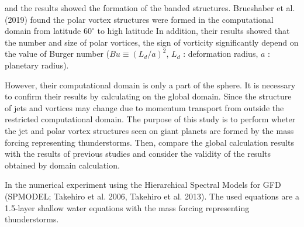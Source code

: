 \documentclass[a4j,8pt]{jarticle}
\begin{document}
and the results showed the formation of the banded structures.
%
Brueshaber et al. (2019) found the polar vortex structures were formed
in the computational domain from latitude $60^\circ$ to high latitude
%
In addition, their results showed
that the number and size of polar vortices,
the sign of vorticity significantly depend on
the value of Burger number ($Bu \equiv (L_d/a)^2$, $L_d$ : deformation radius, $a$ : planetary radius).

However, their computational domain is only a part of the sphere.
It is necessary to confirm their results by calculating on the global domain.
Since the structure of jets and vortices may change due to momentum transport from
outside the restricted computational domain.
%
The purpose of this study is to perform
wheter the jet and polar vortex structures seen on giant planets are
formed by the mass forcing representing thunderstorms.
%
Then, compare the global calculation results with the results of previous studies
and consider the validity of the results obtained by domain calculation.

In the numerical experiment using the Hierarchical Spectral Models for GFD (SPMODEL; Takehiro et al. 2006, Takehiro et al. 2013).
%
The used equations are a 1.5-layer shallow water equations
with the mass forcing representing thunderstorms.
%
\end{document}

